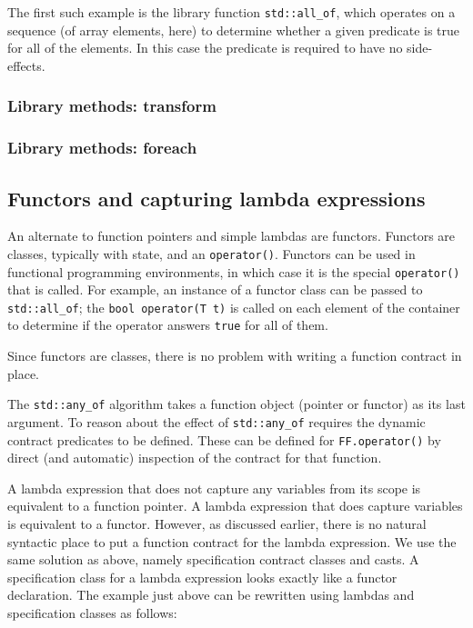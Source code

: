 The first such example is the library function \lstinline|std::all_of|,
which operates on a sequence (of array elements, here) to determine
whether a given predicate is true for all of the elements. In this
case the predicate is required to have no side-effects.

\TODO{}

\subsubsection{Library methods: transform}

\TODO{}

\subsubsection{Library methods: foreach}

\TODO{}

\subsection{Functors and capturing lambda expressions}
\label{sec:functors}

An alternate to function pointers and simple lambdas are functors. Functors are classes, typically with state, and an
\lstinline|operator()|. Functors can be used in functional programming environments, in which case it is the special 
\lstinline|operator()| that is called. For example, an instance of a functor class can be passed to 
\lstinline|std::all_of|; the \lstinline|bool operator(T t)| is called on each element of the container to determine if
the operator answers \lstinline|true| for all of them.

Since functors are classes, there is no problem with writing a function contract in place.



The \lstinline|std::any_of| algorithm takes a function object (pointer or functor) as its last argument. To reason about
the effect of \lstinline|std::any_of| requires the dynamic contract predicates to be defined. These can be defined for 
\lstinline|FF.operator()| by direct (and automatic) inspection of the contract for that function.

A lambda expression that does not capture any variables from its scope is equivalent to a function pointer.
A lambda expression
that does capture variables is equivalent to a functor. 
However, as discussed earlier, there is no natural syntactic place to
put a function contract for the lambda expression. We use the same solution as above, namely specification contract classes and casts.
A specification class for a lambda expression looks exactly like a functor declaration. 
The example just above can be rewritten using lambdas and specification classes as follows:

